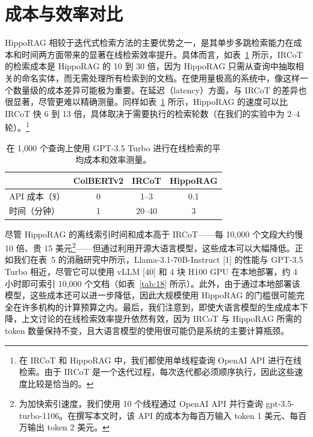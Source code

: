 \documentclass[11pt,UTF8,fontset=fandol]{ctexart}
\begin{document}
\section{成本与效率对比}

HippoRAG 相较于迭代式检索方法的主要优势之一，是其单步多跳检索能力在成本和时间两方面带来的显著在线检索效率提升。具体而言，如表~\ref{tab:17} 所示，IRCoT 的检索成本是 HippoRAG 的 10 到 30 倍，因为 HippoRAG 只需从查询中抽取相关的命名实体，而无需处理所有检索到的文档。在使用量极高的系统中，像这样一个数量级的成本差异可能极为重要。在延迟（latency）方面，与 IRCoT 的差异也很显著，尽管更难以精确测量。同样如表~\ref{tab:17} 所示，HippoRAG 的速度可以比 IRCoT 快 6 到 13 倍，具体取决于需要执行的检索轮数（在我们的实验中为 2--4 轮）。\footnote{在 IRCoT 和 HippoRAG 中，我们都使用单线程查询 OpenAI API 进行在线检索。由于 IRCoT 是一个迭代过程，每次迭代都必须顺序执行，因此这些速度比较是恰当的。}

\begin{table}[H]\centering
\caption{在 1,000 个查询上使用 GPT-3.5 Turbo 进行在线检索的平均成本和效率测量。}
\label{tab:17}
\begin{tabular}{lccc}
\toprule
 & ColBERTv2 & IRCoT & HippoRAG \\
\midrule
API 成本（\$） & 0 & 1--3 & 0.1 \\
时间（分钟） & 1 & 20--40 & 3 \\
\bottomrule
\end{tabular}
\end{table}

尽管 HippoRAG 的离线索引时间和成本高于 IRCoT——每 10,000 个文段大约慢 10 倍、贵 15 美元\footnote{为加快索引速度，我们使用 10 个线程通过 OpenAI API 并行查询 gpt-3.5-turbo-1106。在撰写本文时，该 API 的成本为每百万输入 token 1 美元、每百万输出 token 2 美元。}——但通过利用开源大语言模型，这些成本可以大幅降低。正如我们在表~5 的消融研究中所示，Llama-3.1-70B-Instruct [1] 的性能与 GPT-3.5 Turbo 相近，尽管它可以使用 vLLM [40] 和 4 块 H100 GPU 在本地部署，约 4 小时即可索引 10,000 个文档（如表~\ref{tab:18} 所示）。此外，由于通过本地部署该模型，这些成本还可以进一步降低，因此大规模使用 HippoRAG 的门槛很可能完全在许多机构的计算预算之内。最后，我们注意到，即使大语言模型的生成成本下降，上文讨论的在线检索效率提升依然有效，因为 IRCoT 与 HippoRAG 所需的 token 数量保持不变，且大语言模型的使用很可能仍是系统的主要计算瓶颈。
\end{document}
